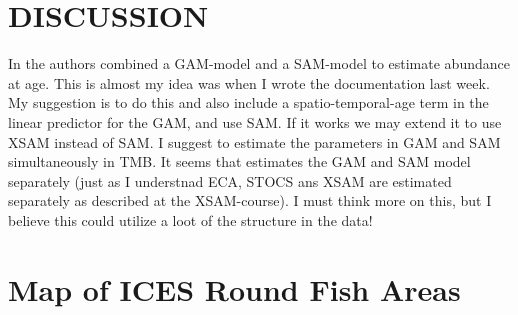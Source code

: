 \documentclass[a4paper 12pt]{article}
\numberwithin{equation}{section}
\begin{document}
\clearpage

\section{DISCUSSION}

In \citet{berg2014evaluation} the authors combined a GAM-model and a SAM-model to estimate abundance at age. This is almost my idea was when I wrote the documentation last week. My suggestion is to do this and also include a spatio-temporal-age term in the linear predictor for the GAM, and use SAM. If it works we may extend it to use XSAM instead of SAM. I suggest to estimate the parameters in GAM and SAM simultaneously in TMB. It seems that \citet{berg2014evaluation} estimates the GAM and SAM model separately (just as I understnad ECA, STOCS ans XSAM are estimated separately as described at the XSAM-course). I must think more on this, but I believe this could utilize a loot of the structure in the data!



\appendix

\section{Map of ICES Round Fish Areas}
\end{document}

